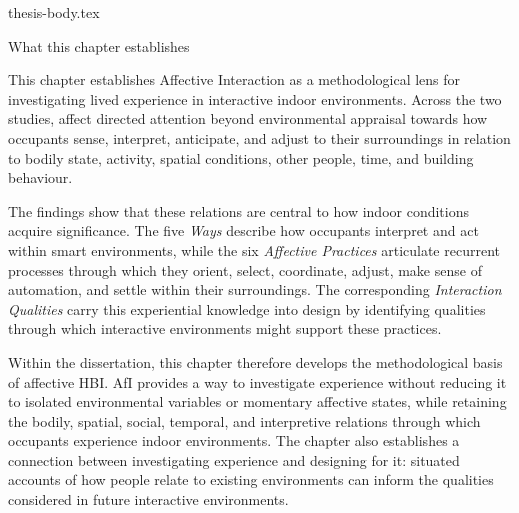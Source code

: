 
\clearpage

{thesis-body.tex}
\FloatBarrier
\clearpage
\begin{chapterclosing}{What this chapter establishes}

This chapter establishes Affective Interaction as a methodological lens for investigating lived experience in interactive indoor environments. Across the two studies, affect directed attention beyond environmental appraisal towards how occupants sense, interpret, anticipate, and adjust to their surroundings in relation to bodily state, activity, spatial conditions, other people, time, and building behaviour.

The findings show that these relations are central to how indoor conditions acquire significance. The five \emph{Ways} describe how occupants interpret and act within smart environments, while the six \emph{Affective Practices} articulate recurrent processes through which they orient, select, coordinate, adjust, make sense of automation, and settle within their surroundings. The corresponding \emph{Interaction Qualities} carry this experiential knowledge into design by identifying qualities through which interactive environments might support these practices. 

Within the dissertation, this chapter therefore develops the methodological basis of affective HBI. AfI provides a way to investigate experience without reducing it to isolated environmental variables or momentary affective states, while retaining the bodily, spatial, social, temporal, and interpretive relations through which occupants experience indoor environments. The chapter also establishes a connection between investigating experience and designing for it: situated accounts of how people relate to existing environments can inform the qualities considered in future interactive environments. 

\end{chapterclosing}

